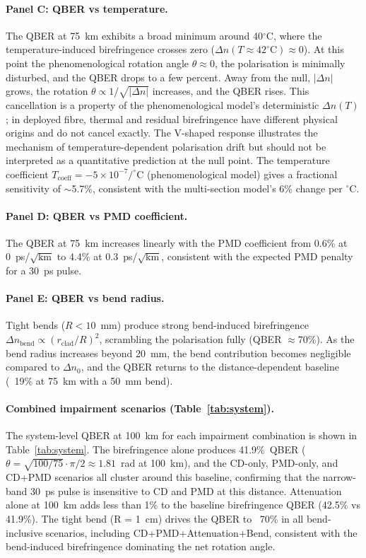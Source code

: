 \documentclass[11pt,a4paper]{article}
\begin{document}
\paragraph{Panel C: QBER vs temperature.}
The QBER at 75~km exhibits a broad minimum around 40$^\circ$C,
where the temperature-induced birefringence crosses zero
($\Delta n(T \approx 42^\circ\text{C}) \approx 0$).  At this point
the phenomenological rotation angle $\theta \approx 0$, the
polarisation is minimally disturbed, and the QBER drops to a few
percent.  Away from the null, $|\Delta n|$ grows, the rotation
$\theta \propto 1/\sqrt{|\Delta n|}$ increases, and the QBER rises.
This cancellation is a property of the phenomenological model's
deterministic $\Delta n(T)$; in deployed fibre, thermal and residual
birefringence have different physical origins and do not cancel
exactly.  The V-shaped response illustrates the mechanism of
temperature-dependent polarisation drift but should not be
interpreted as a quantitative prediction at the null point.
The temperature coefficient
$T_{\text{coeff}} = -5\times10^{-7}/^\circ$C (phenomenological model)
gives a fractional sensitivity of $\sim$5.7\%, consistent with the
multi-section model's 6\% change per $^\circ$C.

\paragraph{Panel D: QBER vs PMD coefficient.}
The QBER at 75~km increases linearly with the PMD coefficient from
0.6\% at 0~ps/$\sqrt{\text{km}}$ to 4.4\% at
0.3~ps/$\sqrt{\text{km}}$, consistent with the expected PMD penalty
for a 30~ps pulse.

\paragraph{Panel E: QBER vs bend radius.}
Tight bends ($R < 10$~mm) produce strong bend-induced birefringence
$\Delta n_{\text{bend}} \propto (r_{\text{clad}}/R)^2$, scrambling
the polarisation fully (QBER $\approx 70\%$).  As the
bend radius increases beyond 20~mm, the bend contribution becomes
negligible compared to $\Delta n_0$, and the QBER returns to the
distance-dependent baseline (~19\% at 75~km with a 50~mm bend).

\paragraph{Combined impairment scenarios (Table~\ref{tab:system}).}
The system-level QBER at 100~km for each impairment combination is
shown in Table~\ref{tab:system}.  The birefringence alone produces
41.9\%~QBER ($\theta = \sqrt{100/75}\cdot\pi/2 \approx 1.81$~rad at
100~km), and the CD-only, PMD-only, and CD+PMD scenarios all cluster
around this baseline, confirming that the narrow-band 30~ps pulse is
insensitive to CD and PMD at this distance.  Attenuation alone at
100~km adds less than 1\% to the baseline birefringence QBER (42.5\%
vs 41.9\%).  The tight bend (R = 1~cm) drives the QBER to ~70\% in
all bend-inclusive scenarios, including
CD+PMD+Attenuation+Bend, consistent with the bend-induced
birefringence dominating the net rotation angle.
\end{document}
